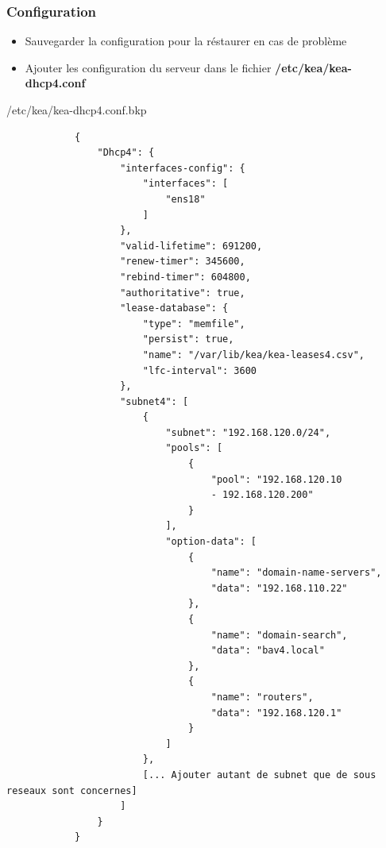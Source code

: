 \documentclass{article}
\begin{document}
\subsubsection{Configuration}
\begin{itemize}
    \item Sauvegarder la configuration pour la réstaurer en cas de problème 
    \item Ajouter les configuration du serveur dans le fichier 
    \textbf{/etc/kea/kea-dhcp4.conf}
\end{itemize}
    \newpage
\begin{configbox}{/etc/kea/kea-dhcp4.conf.bkp}
    \begin{lstlisting}
            {
                "Dhcp4": {
                    "interfaces-config": {
                        "interfaces": [
                            "ens18"
                        ]
                    },
                    "valid-lifetime": 691200,
                    "renew-timer": 345600,
                    "rebind-timer": 604800,
                    "authoritative": true,
                    "lease-database": {
                        "type": "memfile",
                        "persist": true,
                        "name": "/var/lib/kea/kea-leases4.csv",
                        "lfc-interval": 3600
                    },
                    "subnet4": [
                        {
                            "subnet": "192.168.120.0/24",
                            "pools": [
                                {
                                    "pool": "192.168.120.10
                                    - 192.168.120.200"
                                }
                            ],
                            "option-data": [
                                {
                                    "name": "domain-name-servers",
                                    "data": "192.168.110.22"
                                },
                                {
                                    "name": "domain-search",
                                    "data": "bav4.local"
                                },
                                {
                                    "name": "routers",
                                    "data": "192.168.120.1"
                                }
                            ]
                        },
                        [... Ajouter autant de subnet que de sous reseaux sont concernes]
                    ]
                }
            }
    \end{lstlisting}
\end{configbox}
\end{document}

